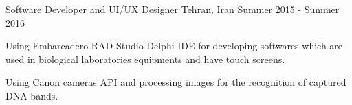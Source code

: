 \begin{cventries}
  \cventry
    {Software Developer and UI/UX Designer} %
    {} %
    {Tehran, Iran} %
    {Summer 2015 - Summer 2016} %
    {
      \begin{cvitems} %
        \item {Using Embarcadero RAD Studio Delphi IDE for developing softwares which are used in biological laboratories equipments and have touch screens.}
        \item {Using Canon cameras API and processing images for the recognition of captured DNA bands.}
      \end{cvitems}
    }


\end{cventries}
